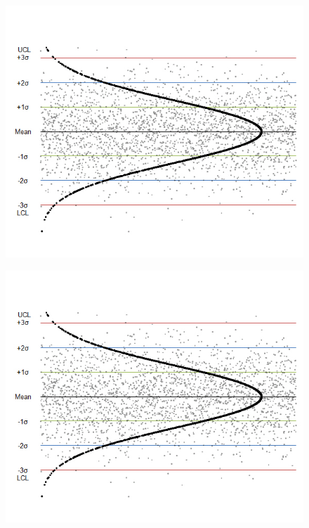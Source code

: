 \documentclass{beamer}
\begin{document}
\begin{frame}
	
	\begin{figure}
		\centering
		\includegraphics[width=1.0\linewidth]{images/ControlChart}
	\end{figure}
	
\end{frame}
\begin{frame}
	
	\begin{figure}
		\centering
		\includegraphics[width=1.0\linewidth]{images/ControlChart}
	\end{figure}
	
\end{frame}
\end{document}

